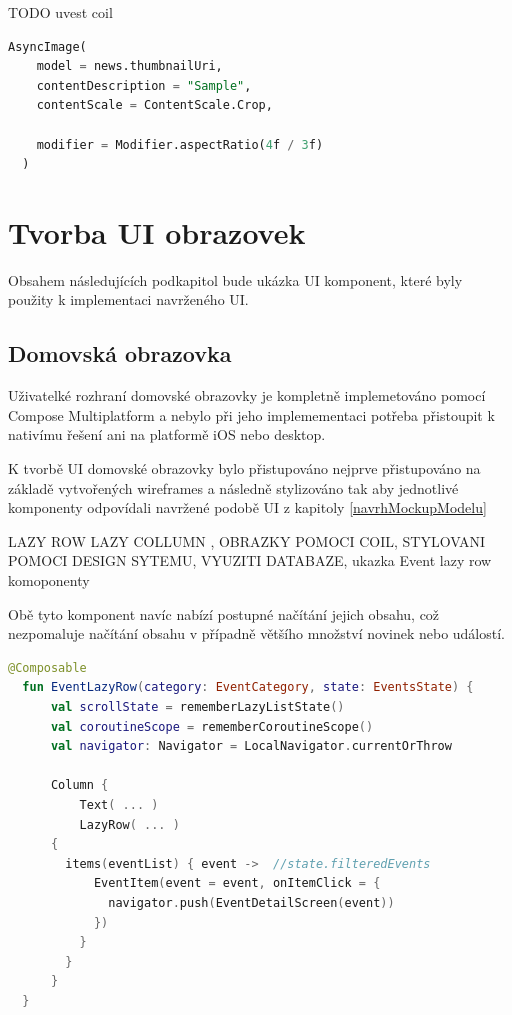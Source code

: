 TODO uvest coil
\begin{lstlisting}[caption={Coil}, label={lst:Coil3}, language=SQL]
  AsyncImage(
    model = news.thumbnailUri,
    contentDescription = "Sample",
    contentScale = ContentScale.Crop,

    modifier = Modifier.aspectRatio(4f / 3f)
  )
\end{lstlisting}


\section{Tvorba UI obrazovek}

Obsahem následujících podkapitol bude ukázka UI komponent, které byly použity k implementaci navrženého UI.

\subsection{Domovská obrazovka}
Uživatelké rozhraní domovské obrazovky je kompletně implemetováno pomocí Compose Multiplatform a nebylo při jeho implemementaci potřeba
přistoupit k nativímu řešení ani na platformě iOS nebo desktop. 

K tvorbě UI domovské obrazovky bylo přistupováno nejprve přistupováno na základě vytvořených wireframes a následně stylizováno tak aby 
jednotlivé komponenty odpovídali navržené podobě UI z kapitoly \ref{navrhMockupModelu}

LAZY ROW LAZY COLLUMN , OBRAZKY POMOCI COIL, STYLOVANI POMOCI DESIGN SYTEMU, VYUZITI DATABAZE, ukazka Event lazy row komoponenty

Obě tyto komponent navíc nabízí postupné načítání jejich obsahu, což nezpomaluje načítání obsahu v případně většího množství novinek
nebo událostí.

\begin{lstlisting}[caption={Coil}, label={lst:Coil3}, language=Kotlin]
  @Composable
  fun EventLazyRow(category: EventCategory, state: EventsState) {
      val scrollState = rememberLazyListState()
      val coroutineScope = rememberCoroutineScope()
      val navigator: Navigator = LocalNavigator.currentOrThrow
  
      Column {
          Text( ... )
          LazyRow( ... ) 
      {  
        items(eventList) { event ->  //state.filteredEvents
            EventItem(event = event, onItemClick = {
              navigator.push(EventDetailScreen(event))
            })
          }
        }
      }
  }
\end{lstlisting}

